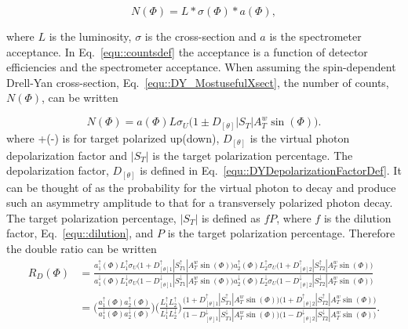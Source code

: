 \begin{equation}
  \label{equ::countsdef}
  N(\Phi) = L * \sigma(\Phi) * a(\Phi),
\end{equation}

\noindent
where $L$ is the luminosity, $\sigma$ is the cross-section and $a$ is the
spectrometer acceptance.  In Eq.~\ref{equ::countsdef} the acceptance is a
function of detector efficiencies and the spectrometer acceptance.  When
assuming the spin-dependent Drell-Yan cross-section,
Eq.~\ref{equ::DY_MostusefulXsect}, the number of counts, $N(\Phi)$, can be
written

\begin{equation}
  \label{equ::spindependentCounts}
  N(\Phi) = a(\Phi)L\sigma_U\Big(1 \pm D_{[\theta]}|S_T|A^w_T\sin(\Phi)\Big).
\end{equation}
\noindent
where +(-) is for target polarized up(down), $D_{[\theta]}$ is the virtual
photon depolarization factor and $|S_T|$ is the target polarization percentage.
The depolarization factor, $D_{[\theta]}$ is defined in
Eq.~\ref{equ::DYDepolarizationFactorDef}.  It can be thought of as the
probability for the virtual photon to decay and produce such an asymmetry
amplitude to that for a transversely polarized photon decay.  The target
polarization percentage, $|S_T|$ is defined as $fP$, where $f$ is the dilution
factor, Eq.~\ref{equ::dilution}, and $P$ is the target polarization percentage.
Therefore the double ratio can be written
\begin{align}
  R_D(\Phi) &= \frac{ a_1^{\uparrow}(\Phi)L_1^{\uparrow}\sigma_U\Big(1 +
    D_{[\theta]1}^{\uparrow}|S_{T1}^{\uparrow}|A^w_T\sin(\Phi)\Big)
    a_2^{\uparrow}(\Phi)L_2^{\uparrow}\sigma_U\Big(1 +
    D_{[\theta]2}^{\uparrow}|S_{T2}^{\uparrow}|A^w_T\sin(\Phi)\Big) } {
    a_1^{\downarrow}(\Phi)L_1^{\downarrow}\sigma_U\Big(1 -
    D_{[\theta]1}^{\downarrow}|S_{T1}^{\downarrow}|A^w_T\sin(\Phi)\Big)
    a_2^{\downarrow}(\Phi)L_2^{\downarrow}\sigma_U\Big(1 -
    D_{[\theta]2}^{\downarrow}|S_{T2}^{\downarrow}|A^w_T\sin(\Phi)\Big) }
  \\ \nonumber &= \Big(\frac{a_1^{\uparrow}(\Phi)a_2^{\uparrow}(\Phi)}
     {a_1^{\downarrow}(\Phi)a_2^{\downarrow}(\Phi)} \Big)
     \Big(\frac{L_1^{\uparrow}L_2^{\uparrow}}
         {L_1^{\downarrow}L_2^{\downarrow}}\Big)
         \frac{\Big(1+D_{[\theta]1}^{\uparrow}|S_{T1}^{\uparrow}|A^w_T\sin(\Phi)\Big)
           \Big(1+D_{[\theta]2}^{\uparrow}|S_{T2}^{\uparrow}|A^w_T\sin(\Phi)\Big)}
              {\Big(1-D_{[\theta]1}^{\downarrow}|S_{T1}^{\downarrow}|A^w_T\sin(\Phi)\Big)
                \Big(1-D_{[\theta]2}^{\downarrow}|S_{T2}^{\downarrow}|A^w_T\sin(\Phi)\Big)
              }.
\end{align}
